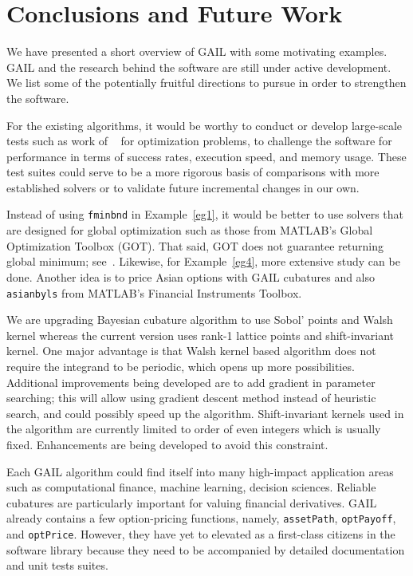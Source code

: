 \section{Conclusions and Future Work}
\label{sec:concl}
We have presented a short overview of GAIL with some motivating
examples. GAIL and the research behind the software are still under active
development. We list some of the potentially fruitful
directions to pursue in order to strengthen the software.

For the existing algorithms, it would be worthy to conduct or develop
large-scale tests such as work of
~\cite{dolan2002benchmarking,floudas2013handbook} for optimization
problems, to challenge the software for performance in terms of success
rates, execution speed, and memory usage. These test suites could serve to
be a more rigorous basis of comparisons with more established solvers  or
to validate future incremental changes in our own.  

Instead of using \texttt{fminbnd} in Example~\ref{eg1}, it would be better
to use solvers that are designed for global optimization such as those from
 MATLAB's Global Optimization Toolbox (GOT). That said, GOT does not
guarantee returning global minimum; see~\cite{GOT}. Likewise, for 
Example~\ref{eg4}, more extensive study can be done. Another
idea is to price Asian options with GAIL cubatures and also
\texttt{asianbyls} from MATLAB's Financial Instruments Toolbox.

We are upgrading Bayesian cubature algorithm to use Sobol' points and Walsh
kernel whereas the current version uses rank-1 lattice points and
shift-invariant kernel. One major advantage is that Walsh kernel based
algorithm does not require the integrand to be periodic, which opens up
more possibilities. Additional improvements being developed are to add
gradient in parameter searching; this will allow using gradient descent
method instead of heuristic search, and could possibly speed up the algorithm.
Shift-invariant kernels used in the algorithm are currently limited to order
of even integers which is usually fixed. Enhancements are being developed
to avoid this constraint.

Each GAIL algorithm could find itself into many high-impact application
areas such as computational finance, machine learning, decision sciences.
Reliable cubatures are particularly important for valuing financial
derivatives. GAIL already contains a few option-pricing functions,  
namely, \texttt{assetPath}, \texttt{optPayoff}, and  \texttt{optPrice}. 
However, they have yet to elevated as a first-class citizens in
the software library because they need to be accompanied by detailed documentation
and unit tests suites.

